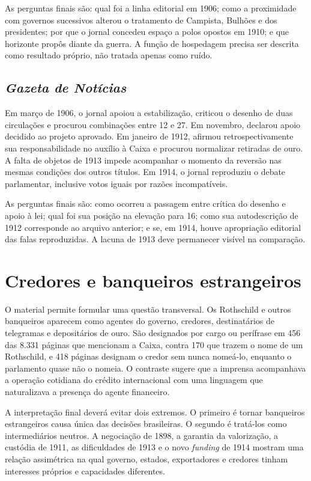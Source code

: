 As perguntas finais são: qual foi a linha editorial em 1906; como a proximidade com governos sucessivos alterou o tratamento de Campista, Bulhões e dos presidentes; por que o jornal concedeu espaço a polos opostos em 1910; e que horizonte propôs diante da guerra. A função de hospedagem precisa ser descrita como resultado próprio, não tratada apenas como ruído.

\subsection{\textit{Gazeta de Notícias}}

Em março de 1906, o jornal apoiou a estabilização, criticou o desenho de duas circulações e procurou combinações entre 12 e 27. Em novembro, declarou apoio decidido ao projeto aprovado. Em janeiro de 1912, afirmou retrospectivamente sua responsabilidade no auxílio à Caixa e procurou normalizar retiradas de ouro. A falta de objetos de 1913 impede acompanhar o momento da reversão nas mesmas condições dos outros títulos. Em 1914, o jornal reproduziu o debate parlamentar, inclusive votos iguais por razões incompatíveis.

As perguntas finais são: como ocorreu a passagem entre crítica do desenho e apoio à lei; qual foi sua posição na elevação para 16; como sua autodescrição de 1912 corresponde ao arquivo anterior; e se, em 1914, houve apropriação editorial das falas reproduzidas. A lacuna de 1913 deve permanecer visível na comparação.

\section{Credores e banqueiros estrangeiros}

O material permite formular uma questão transversal. Os Rothschild e outros banqueiros aparecem como agentes do governo, credores, destinatários de telegramas e depositários de ouro. São designados por cargo ou perífrase em 456 das 8.331 páginas que mencionam a Caixa, contra 170 que trazem o nome de um Rothschild, e 418 páginas designam o credor sem nunca nomeá-lo, enquanto o parlamento quase não o nomeia. O contraste sugere que a imprensa acompanhava a operação cotidiana do crédito internacional com uma linguagem que naturalizava a presença do agente financeiro.

A interpretação final deverá evitar dois extremos. O primeiro é tornar banqueiros estrangeiros causa única das decisões brasileiras. O segundo é tratá-los como intermediários neutros. A negociação de 1898, a garantia da valorização, a custódia de 1911, as dificuldades de 1913 e o novo \textit{funding} de 1914 mostram uma relação assimétrica na qual governo, estados, exportadores e credores tinham interesses próprios e capacidades diferentes.

